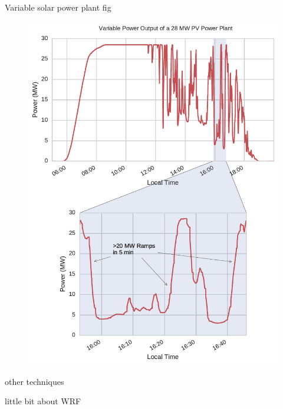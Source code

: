 Variable solar power plant fig
\begin{figure}[h]
\includegraphics[width=\textwidth]{figs/avalon_ramps.pdf}
\end{figure}

other techniques

little bit about WRF

